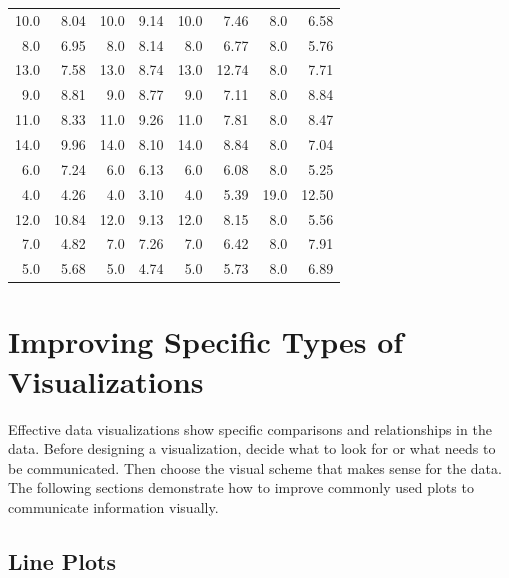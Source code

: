 \begin{problem}
\begin{table}[H]
{\begin{tabular}{rr|rr|rr|rr}
    \hline
    10.0 & 8.04  & 10.0 & 9.14 & 10.0 & 7.46  & 8.0  & 6.58  \\
    8.0  & 6.95  & 8.0  & 8.14 & 8.0  & 6.77  & 8.0  & 5.76  \\
    13.0 & 7.58  & 13.0 & 8.74 & 13.0 & 12.74 & 8.0  & 7.71  \\
    9.0  & 8.81  & 9.0  & 8.77 & 9.0  & 7.11  & 8.0  & 8.84  \\
    11.0 & 8.33  & 11.0 & 9.26 & 11.0 & 7.81  & 8.0  & 8.47  \\
    14.0 & 9.96  & 14.0 & 8.10 & 14.0 & 8.84  & 8.0  & 7.04  \\
    6.0  & 7.24  & 6.0  & 6.13 & 6.0  & 6.08  & 8.0  & 5.25  \\
    4.0  & 4.26  & 4.0  & 3.10 & 4.0  & 5.39  & 19.0 & 12.50 \\
    12.0 & 10.84 & 12.0 & 9.13 & 12.0 & 8.15  & 8.0  & 5.56  \\
    7.0  & 4.82  & 7.0  & 7.26 & 7.0  & 6.42  & 8.0  & 7.91  \\
    5.0  & 5.68  & 5.0  & 4.74 & 5.0  & 5.73  & 8.0  & 6.89  \\
\end{tabular}}
\end{table}
\label{prob:anscombes-quartet}
\end{problem}

\section*{Improving Specific Types of Visualizations} %

Effective data visualizations show specific comparisons and relationships in the data.
Before designing a visualization, decide what to look for or what needs to be communicated.
Then choose the visual scheme that makes sense for the data.
The following sections demonstrate how to improve commonly used plots to communicate information visually.

\subsection*{Line Plots} %

